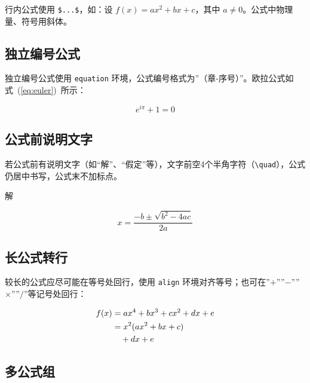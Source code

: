 行内公式使用 \texttt{\$...\$}，如：设 $f(x) = ax^2 + bx + c$，其中 $a \neq 0$。公式中物理量、符号用斜体。

\subsection{独立编号公式}

独立编号公式使用 \texttt{equation} 环境，公式编号格式为”（章-序号）”。欧拉公式如式~(\ref{eq:euler})~所示：

\begin{equation}
    e^{i\pi} + 1 = 0
    \label{eq:euler}
\end{equation}

\subsection{公式前说明文字}

若公式前有说明文字（如“解”、“假定”等），文字前空4个半角字符（\texttt{\textbackslash quad}），公式仍居中书写，公式末不加标点。

\hspace{2em}解\quad

\begin{equation}
    x = \frac{-b \pm \sqrt{b^2 - 4ac}}{2a}
    \label{eq:quadratic}
\end{equation}

\subsection{长公式转行}

较长的公式应尽可能在等号处回行，使用 \texttt{align} 环境对齐等号；也可在”$+$””$-$””$\times$””$/$”等记号处回行：

\begin{align}
    f(x) &= ax^4 + bx^3 + cx^2 + dx + e                                        \label{eq:poly} \\
         &= x^2(ax^2 + bx + c)                                                  \notag \\
         &\quad + dx + e                                                         \notag
\end{align}

\subsection{多公式组}

